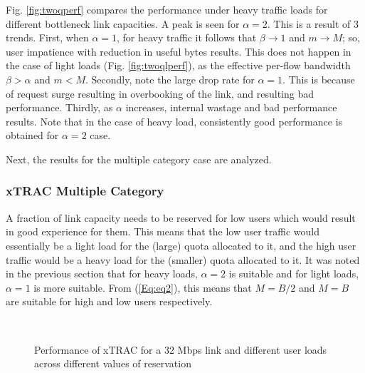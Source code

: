 \documentclass[conference]{../../IEEEtran}
\begin{document}
Fig. \ref{fig:twoqperf} compares the performance under heavy traffic loads for different bottleneck link capacities. A peak is seen for $\alpha=2$. This is a result of 3 trends. First, when $\alpha=1$, for heavy traffic it follows that $\beta\rightarrow 1$ and $m\rightarrow M$; so, user impatience with reduction in useful bytes results. This does not happen in the case of light loads (Fig. \ref{fig:twoqlperf}), as the effective per-flow bandwidth $\beta > \alpha$ and $m < M$. Secondly, note the large drop rate for  $\alpha=1$. This is because of request surge resulting in overbooking of the link, and resulting bad performance. Thirdly, as $\alpha$ increases, internal wastage and bad performance results. Note that in the case of heavy load, consistently good performance is obtained for $\alpha=2$ case. 

Next, the results for the multiple category case are analyzed.

\subsubsection{xTRAC Multiple Category}
\label{sec:tcracsq}

A fraction of link capacity needs to be reserved for low users which would result in good experience for them. This means that the low user traffic would essentially be a light load for the (large) quota allocated to it, and the high user traffic would be a heavy load for the (smaller) quota allocated to it. It was noted in the previous section that for heavy loads, $\alpha = 2$ is suitable and for light loads, $\alpha = 1$ is more suitable. From (\ref{Eq:eq2}), this means that $M=B/2$ and $M=B$ are suitable for high and low users respectively.


	\begin{figure}[hbt]
		\begin{center}
		\\ %
		\caption{Performance of xTRAC for a 32 Mbps link and different user loads across different values of reservation}
		\label{fig:twoqsrch}
		\end{center}
	\end{figure}	
\end{document}
